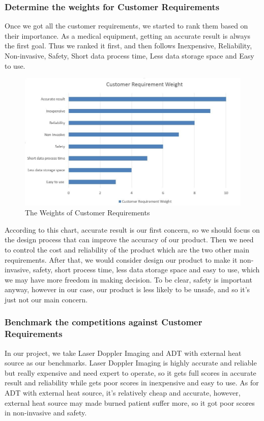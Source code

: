 \documentclass[paper=letter, fontsize=11pt]{scrartcl}
\numberwithin{equation}{section}		%
\numberwithin{figure}{section}			%
\numberwithin{table}{section}			%
\begin{document}
\subsubsection{Determine the weights for Customer Requirements}
Once we got all the customer requirements, we started to rank them based on their importance. As a medical equipment, getting an accurate result is always the first goal. Thus we ranked it first, and then follows Inexpensive, Reliability, Non-invasive, Safety, Short data process time, Less data storage space and Easy to use.

\begin{figure}[H]
    \centering
	\includegraphics[scale=0.7]{CRweight.jpg}
	\caption{The Weights of Customer Requirements}
\end{figure}
According to this chart, accurate result is our first concern, so we should focus on the design process that can improve the accuracy of our product. Then we need to control the cost and reliability of the product which are the two other main requirements. After that, we would consider design our product to make it non-invasive, safety, short process time, less data storage space and easy to use, which we may have more freedom in making decision. To be clear, safety is important anyway, however in our case, our product is less likely to be unsafe, and so it's just not our main concern. 

\subsubsection{Benchmark the competitions against Customer Requirements}
In our project, we take Laser Doppler Imaging and ADT with external heat source as our benchmarks. Laser Doppler Imaging is highly accurate and reliable but really expensive and need expert to operate, so it gets full scores in accurate result and reliability while gets poor scores in inexpensive and easy to use. As for ADT with external heat source, it's relatively cheap and accurate, however, external heat source may made burned patient suffer more, so it got poor scores in non-invasive and safety.
\end{document}
